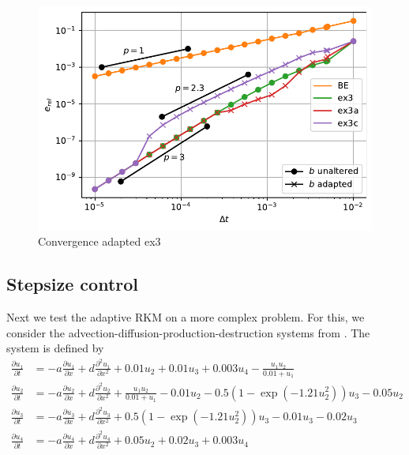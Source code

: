 \documentclass[a4paper]{article}
\numberwithin{equation}{section}
\theoremstyle{plain}
\theoremstyle{definition}
\numberwithin{theorem}{section}
\newcommand{\1}{\mathbbm{1}}
\begin{document}
\begin{figure}[h]
\centering
\includegraphics[scale=0.75]{plots/conv_heat.pdf}
\caption{Convergence adapted ex3}
\label{fig:conv_impl}
\end{figure}


\subsection{Stepsize control}

Next we test the adaptive RKM on a more complex problem. 
For this, we consider the advection-diffusion-production-destruction systems from \cite{kopecz_comparison_2019}. The system is defined by
\begin{subequations}
\label{eq:ADR}
\begin{align}
\frac{\partial u_1}{\partial t} &=-a \frac{\partial u_1}{\partial x} + d\frac{\partial^2 u_1}{\partial x ^2} + 0.01u_2 + 0.01 u_3 +0.003u_4 - \frac{u_1 u_2}{0.01+u_1} \\ 
\frac{\partial u_2}{\partial t} &=-a \frac{\partial u_2}{\partial x} + d\frac{\partial^2 u_2}{\partial x ^2} + \frac{u_1u_2}{0.01+u_1} -0.01 u_2-0.5(1-\exp(-1.21 u_2^2)) u_3 -0.05 u_2 \\ 
\frac{\partial u_3}{\partial t} &=-a \frac{\partial u_3}{\partial x} + d\frac{\partial^2 u_3}{\partial x ^2} + 0.5(1-\exp(-1.21u_2^2)) u_3 - 0.01 u_3 -0.02 u_3 \\ 
\frac{\partial u_4}{\partial t} &=-a \frac{\partial u_4}{\partial x} + d\frac{\partial^2 u_4}{\partial x ^2} + 0.05 u_2 + 0.02 u_3 + 0.003u_4 
\end{align}
\end{subequations}
\end{document}
